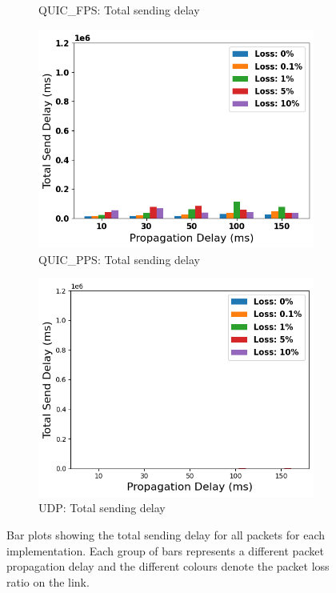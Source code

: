 \documentclass{mpaper}
\begin{document}
\begin{figure}
\begin{subfigure}[b]{0.32\textwidth}
      \caption{QUIC\_FPS: Total sending delay}
      \label{fig:FPS_SEND}
  \end{subfigure}
  \hfill
  \begin{subfigure}[b]{0.32\textwidth}
      \centering
      \includegraphics[width=\textwidth]{Total_Send/QUIC_PPS/QUIC_PPS_Total_Send_delay.png}
      \caption{QUIC\_PPS: Total sending delay}
      \label{fig:PPS_SEND}
  \end{subfigure}
  \hfill
  \begin{subfigure}[b]{0.32\textwidth}
      \centering
      \includegraphics[width=\textwidth]{Total_Send/UDP/UDP_Total_Send_delay.png}
      \caption{UDP: Total sending delay}
      \label{fig:UDP_SEND}
  \end{subfigure}
     \vspace{0.1cm}
     \centering
     \caption{Bar plots showing the total sending delay for all packets for each implementation. Each group of bars represents a different packet propagation delay and the different colours denote the packet loss ratio on the link.}
     \label{fig: SEND}
\end{figure}
\end{document}
